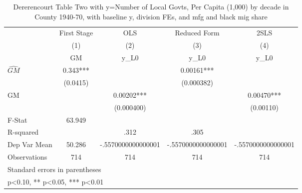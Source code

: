 \begin{table}[htbp]\centering
\def\sym#1{\ifmmode^{#1}\else\(^{#1}\)\fi}
\caption{Dererencourt Table Two with y=Number of Local Govts, Per Capita (1,000) by decade in County 1940-70, with baseline y, division FEs, and mfg and black mig share}
\begin{tabular}{l*{4}{c}}
\toprule
                    & First Stage   &         OLS   &Reduced Form   &        2SLS   \\
                    &\multicolumn{1}{c}{(1)}&\multicolumn{1}{c}{(2)}&\multicolumn{1}{c}{(3)}&\multicolumn{1}{c}{(4)}\\
                    &\multicolumn{1}{c}{GM}&\multicolumn{1}{c}{y\_L0}&\multicolumn{1}{c}{y\_L0}&\multicolumn{1}{c}{y\_L0}\\
\midrule
$\hat{GM}$          &       0.343***&               &     0.00161***&               \\
                    &    (0.0415)   &               &  (0.000382)   &               \\
\addlinespace
GM                  &               &     0.00202***&               &     0.00470***\\
                    &               &  (0.000400)   &               &   (0.00110)   \\
\midrule
F-Stat              &      63.949   &               &               &               \\
R-squared           &               &        .312   &        .305   &               \\
Dep Var Mean        &      50.286   &-.5570000000000001   &-.5570000000000001   &-.5570000000000001   \\
Observations        &         714   &         714   &         714   &         714   \\
\bottomrule
\multicolumn{5}{l}{\footnotesize Standard errors in parentheses}\\
\multicolumn{5}{l}{\footnotesize * p<0.10, ** p<0.05, *** p<0.01}\\
\end{tabular}
\end{table}
